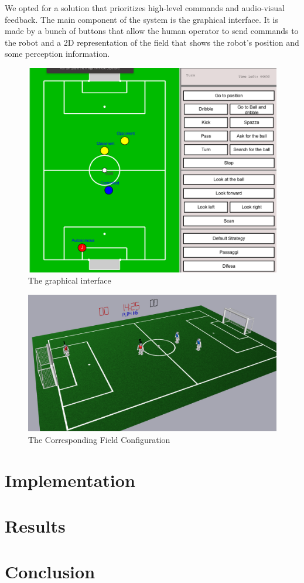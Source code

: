 \documentclass[a4paper, onecolumn, 12pt]{article}
\begin{document}
We opted for a solution that prioritizes high-level commands and audio-visual
feedback. The main component of the system is the graphical interface. It is
made by a bunch of buttons that allow the human operator to send commands to the
robot and a 2D representation of the field that shows the robot's position and
some perception information.  

\begin{figure}[H]
    \centering
    \includegraphics[width=0.9\linewidth]{assets/interface.png}
    \caption{The graphical interface}
    \label{fig:interface}
\end{figure}

\begin{figure}[H]
    \centering
    \includegraphics[width=0.9\linewidth]{assets/simrobot.png}
    \caption{The Corresponding Field Configuration}
    \label{fig:nao}
\end{figure}

\section{Implementation}
\label{sec:impl}


\section{Results}
\label{sec:res}


\section{Conclusion}
\label{sec:con}




\end{document}
